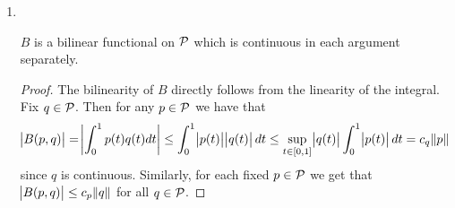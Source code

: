\begin{enumerate}[label = \textbf{Exercise \arabic*.},wide = 0pt, itemsep = 1.5ex]
\begin{enumerate}[label = \textbf{\alph*.},wide = 0pt, itemsep = 1.5ex]
				\begin{proof}
					Let $(x,y) \in X \times X$ and $(x_n,y_n)_{n \in \Nbb}$ be a sequence in $X \times X$ converging to $(x,y)$. We claim that $x_n \to x$ and $y_n \to y$ in $X$. Indeed
					\begin{equation*}
						\norm{x_n - x} \leq \norm{x_n - x} + \norm{y_n - y} = \norm{(x_n,y_n) - (x,y)} \to 0
					\end{equation*}
					\noindent as $n \to \infty$ and similarly
					\begin{equation*}
						\norm{y_n - y} \leq \norm{x_n - x} + \norm{y_n - y} = \norm{(x_n,y_n) - (x,y)} \to 0.
					\end{equation*}
					Moreover, since $y_n \to y$, $y_n$ is bounded, i.e. there exists some $M \geq 0$ such that $\norm{y_n} \leq M$ for all $n \in \Nbb$. Hence
					\begin{align*}
						\abs{B(x_n,y_n) - B(x,y)} &= \abs{B(x_n,y_n) - B(x,y_n) + B(x,y_n) - B(x,y)}\\
						&= \abs{B(x_n - x,y_n) + B(x,y_n - y)}\\
						&\leq \abs{B(x_n - x,y_n)} + \abs{B(x,y_n - y)}\\
						&\leq c \norm{x_n - x}\norm{y_n} + c \norm{x}\norm{y_n - y}\\
						&\leq cM \norm{x_n - x} + c\norm{x}\norm{y_n - y} \rightarrow 0
					\end{align*}
					\noindent as $n \to \infty$.
				\end{proof}
			\item
				~
				\begin{lemma}
					$B$ is a bilinear functional on $\cal{P}$ which is continuous in each argument separately.
				\end{lemma}

				\begin{proof}
					The bilinearity of $B$ directly follows from the linearity of the integral. Fix $q \in \cal{P}$. Then for any $p \in \cal{P}$ we have that
					\begin{equation*}
						\abs{B(p,q)} = \abs[3]{\int_0^1 p(t)q(t)dt} \leq \int_0^1 \abs{p(t)}\abs{q(t)}dt \leq \sup_{t \in \intcc{0,1}}\abs{q(t)} \int_0^1 \abs{p(t)}dt = c_q \norm{p}
					\end{equation*}
					\noindent since $q$ is continuous. Similarly, for each fixed $p \in \cal{P}$ we get that $\abs{B(p,q)} \leq c_p \norm{q}$ for all $q \in \cal{P}$.
				\end{proof}
		\end{enumerate}
\end{enumerate}


